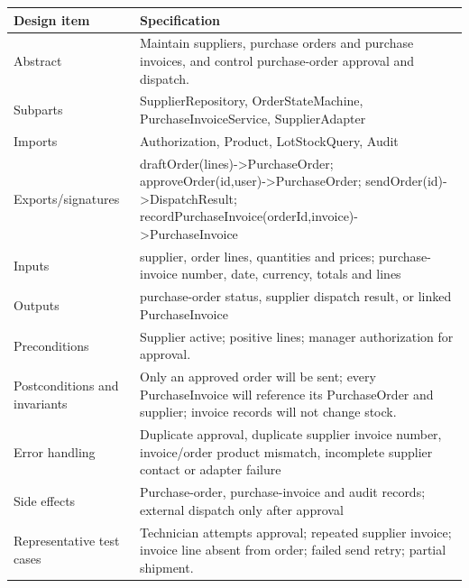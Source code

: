 {\def\LTcaptype{none} %
\begin{longtable}[]{|
  >{\raggedright\arraybackslash}m{}|
  >{\raggedright\arraybackslash}m{}|}
\hline
\begin{minipage}[c]{\linewidth}\raggedright
\textbf{Design item}
\end{minipage} & \begin{minipage}[c]{\linewidth}\raggedright
\textbf{Specification}
\end{minipage} \\
\hline
\endhead

\endlastfoot
Abstract & Maintain suppliers, purchase orders and purchase invoices, and control purchase-order approval and dispatch. \\ \hline
Subparts & SupplierRepository, OrderStateMachine, PurchaseInvoiceService, SupplierAdapter \\ \hline
Imports & Authorization, Product, LotStockQuery, Audit \\ \hline
Exports/signatures & draftOrder(lines)-\textgreater PurchaseOrder; approveOrder(id,user)-\textgreater PurchaseOrder; sendOrder(id)-\textgreater DispatchResult; recordPurchaseInvoice(orderId,invoice)-\textgreater PurchaseInvoice \\ \hline
Inputs & supplier, order lines, quantities and prices; purchase-invoice number, date, currency, totals and lines \\ \hline
Outputs & purchase-order status, supplier dispatch result, or linked PurchaseInvoice \\ \hline
Preconditions & Supplier active; positive lines; manager authorization for approval. \\ \hline
Postconditions and invariants & Only an approved order will be sent; every PurchaseInvoice will reference its PurchaseOrder and supplier; invoice records will not change stock. \\ \hline
Error handling & Duplicate approval, duplicate supplier invoice number, invoice/order product mismatch, incomplete supplier contact or adapter failure \\ \hline
Side effects & Purchase-order, purchase-invoice and audit records; external dispatch only after approval \\ \hline
Representative test cases & Technician attempts approval; repeated supplier invoice; invoice line absent from order; failed send retry; partial shipment. \\ \hline
\end{longtable}
}

